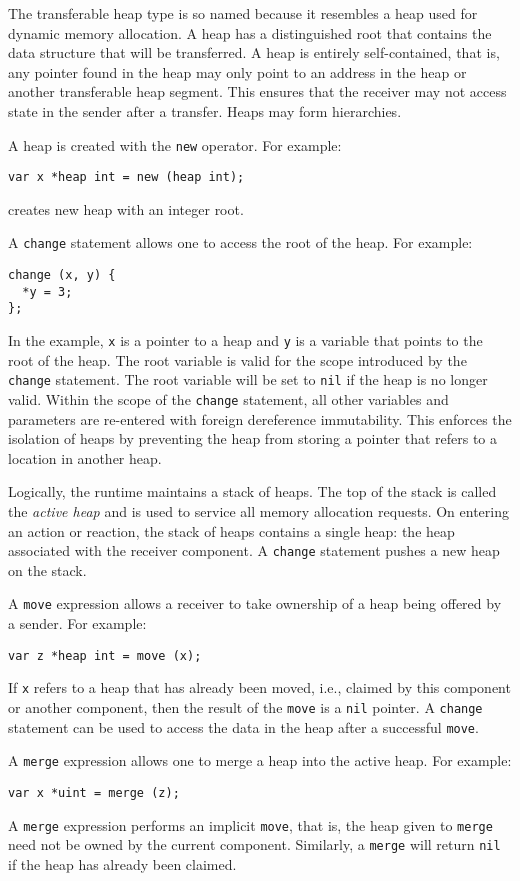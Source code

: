 The transferable heap type is so named because it resembles a heap used for dynamic memory allocation.
A heap has a distinguished root that contains the data structure that will be transferred.
A heap is entirely self-contained, that is, any pointer found in the heap may only point to an address in the heap or another transferable heap segment.
This ensures that the receiver may not access state in the sender after a transfer.
Heaps may form hierarchies.

A heap is created with the \verb+new+ operator.
For example:
\begin{verbatim}
var x *heap int = new (heap int);
\end{verbatim}
creates new heap with an integer root.

A \verb+change+ statement allows one to access the root of the heap.
For example:
\begin{verbatim}
change (x, y) {
  *y = 3;
};
\end{verbatim}
In the example, \verb+x+ is a pointer to a heap and \verb+y+ is a variable that points to the root of the heap.
The root variable is valid for the scope introduced by the \verb+change+ statement.
The root variable will be set to \verb+nil+ if the heap is no longer valid.
Within the scope of the \verb+change+ statement, all other variables and parameters are re-entered with foreign dereference immutability.
This enforces the isolation of heaps by preventing the heap from storing a pointer that refers to a location in another heap.

Logically, the runtime maintains a stack of heaps.
The top of the stack is called the \emph{active heap} and is used to service all memory allocation requests.
On entering an action or reaction, the stack of heaps contains a single heap:  the heap associated with the receiver component.
A \verb+change+ statement pushes a new heap on the stack.

A \verb+move+ expression allows a receiver to take ownership of a heap being offered by a sender.
For example:
\begin{verbatim}
var z *heap int = move (x);
\end{verbatim}
If \verb+x+ refers to a heap that has already been moved, i.e., claimed by this component or another component, then the result of the \verb+move+ is a \verb+nil+ pointer.
A \verb+change+ statement can be used to access the data in the heap after a successful \verb+move+.

A \verb+merge+ expression allows one to merge a heap into the active heap.
For example:
\begin{verbatim}
var x *uint = merge (z);
\end{verbatim}
A \verb+merge+ expression performs an implicit \verb+move+, that is, the heap given to \verb+merge+ need not be owned by the current component.
Similarly, a \verb+merge+ will return \verb+nil+ if the heap has already been claimed.

